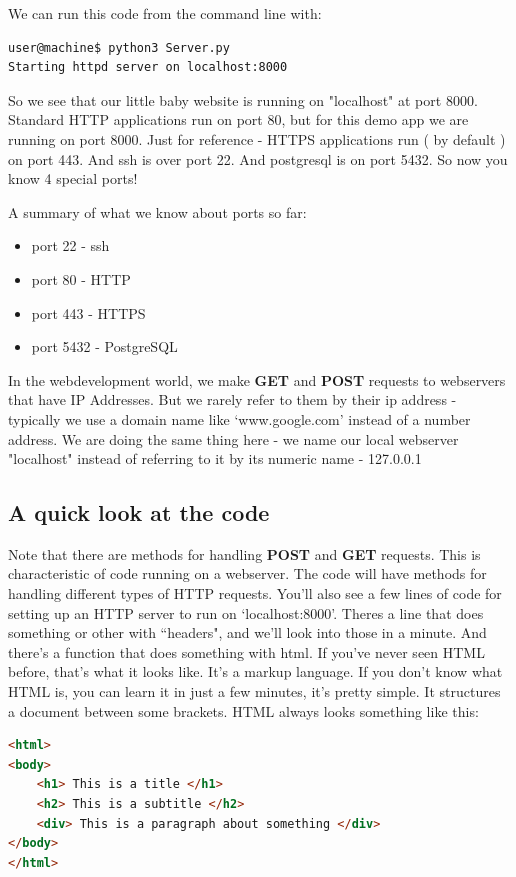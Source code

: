 \documentclass[10pt]{article}
\begin{document}
We can run this code from the command line with:

\begin{lstlisting}
user@machine$ python3 Server.py
Starting httpd server on localhost:8000
\end{lstlisting}

So we see that our little baby website is running on "localhost" at port 8000. Standard HTTP applications run on port 80, but for this demo app we are running on port 8000. Just for reference - HTTPS applications run ( by default ) on port 443. And ssh is over port 22. And postgresql is on port 5432. So now you know 4 special ports!

A summary of what we know about ports so far:
\begin{itemize}
\item port 22 - ssh
\item port 80 - HTTP
\item port 443 - HTTPS
\item port 5432 - PostgreSQL
\end{itemize}

In the webdevelopment world, we make \textbf{GET} and \textbf{POST} requests to webservers that have IP Addresses. But we rarely refer to them by their ip address - typically we use a domain name like `www.google.com' instead of a number address. We are doing the same thing here - we name our local webserver "localhost" instead of referring to it by its numeric name - 127.0.0.1 

\subsection{A quick look at the code} \label{samplehtml}

Note that there are methods for handling \textbf{POST} and \textbf{GET} requests. This is characteristic of code running on a webserver. The code will have methods for handling different types of HTTP requests. You'll also see a few lines of code for setting up an HTTP server to run on `localhost:8000'. Theres a line that does something or other with ``headers", and we'll look into those in a minute. And there's a function that does something with html. If you've never seen HTML before, that's what it looks like. It's a markup language. If you don't know what HTML is, you can learn it in just a few minutes, it's pretty simple. It structures a document between some brackets. HTML always looks something like this:

\begin{lstlisting}[language=HTML]
<html>
<body>
	<h1> This is a title </h1>
	<h2> This is a subtitle </h2>
	<div> This is a paragraph about something </div>
</body>
</html>
\end{lstlisting}
\end{document}
